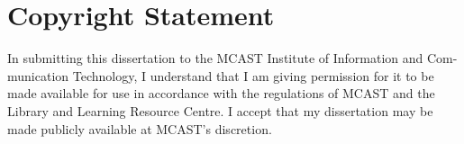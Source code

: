 \newpage

\chapter*{\centering Copyright Statement}

\begin{spacing}{1.5}
\setlength{\parskip}{0.3in}


In submitting this dissertation to the MCAST Institute of Information and Com-
munication Technology, I understand that I am giving permission for it to be
made available for use in accordance with the regulations of MCAST and the
Library and Learning Resource Centre. I accept that my dissertation may be
made publicly available at MCAST’s discretion.

\vspace{2.5cm}

\begin{center}
	\makebox[4cm]{\dotfill}  \hfill \makebox[4cm]{\dotfill}\\
	      \hfill {}
\end{center}
\end{spacing}
\newpage
